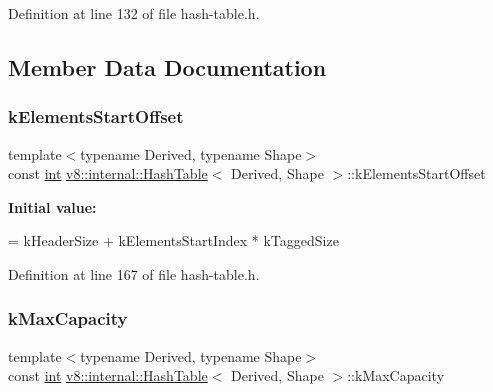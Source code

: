 Definition at line 132 of file hash-\/table.\+h.



\subsection{Member Data Documentation}
\mbox{\label{classv8_1_1internal_1_1HashTable_ac934870af4768dd85fdf0f2acb43acdd}} 
\subsubsection{\texorpdfstring{k\+Elements\+Start\+Offset}{kElementsStartOffset}}
{\footnotesize\ttfamily template$<$typename Derived, typename Shape$>$ \\
const \mbox{\hyperlink{classint}{int}} \mbox{\hyperlink{classv8_1_1internal_1_1HashTable}{v8\+::internal\+::\+Hash\+Table}}$<$ Derived, Shape $>$\+::k\+Elements\+Start\+Offset\hspace{0.3cm}{\ttfamily [static]}}

{\bfseries Initial value\+:}
\begin{DoxyCode}
=
      kHeaderSize + kElementsStartIndex * kTaggedSize
\end{DoxyCode}


Definition at line 167 of file hash-\/table.\+h.

\mbox{\label{classv8_1_1internal_1_1HashTable_a794ae82b53ca932ee7264963865631d8}} 
\subsubsection{\texorpdfstring{k\+Max\+Capacity}{kMaxCapacity}}
{\footnotesize\ttfamily template$<$typename Derived, typename Shape$>$ \\
const \mbox{\hyperlink{classint}{int}} \mbox{\hyperlink{classv8_1_1internal_1_1HashTable}{v8\+::internal\+::\+Hash\+Table}}$<$ Derived, Shape $>$\+::k\+Max\+Capacity\hspace{0.3cm}{\ttfamily [static]}}

